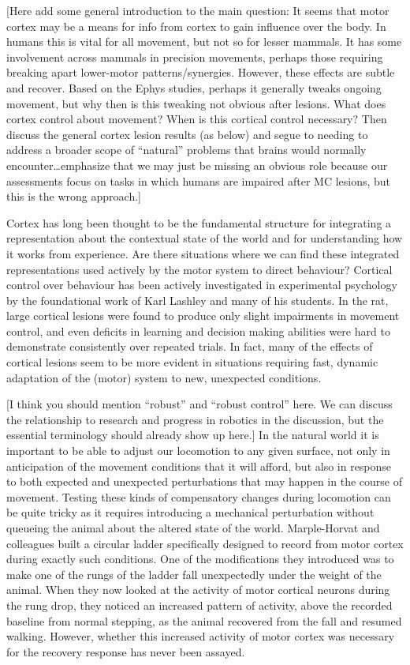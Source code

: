 [Here add some general introduction to the main question: It seems that motor cortex may be a means for info from cortex to gain influence over the body. In humans this is vital for all movement, but not so for lesser mammals. It has some involvement across mammals in precision movements, perhaps those requiring breaking apart lower-motor patterns/synergies. However, these effects are subtle and recover. Based on the Ephys studies, perhaps it generally tweaks ongoing movement, but why then is this tweaking not obvious after lesions. What does cortex control about movement? When is this cortical control necessary? Then discuss the general cortex lesion results (as below) and segue to needing to address a broader scope of “natural” problems that brains would normally encounter…emphasize that we may just be missing an obvious role because our assessments focus on tasks in which humans are impaired after MC lesions, but this is the wrong approach.]


Cortex has long been thought to be the fundamental structure for integrating a representation about the contextual state of the world and for understanding how it works from experience. Are there situations where we can find these integrated representations used actively by the motor system to direct behaviour? Cortical control over behaviour has been actively investigated in experimental psychology by the foundational work of Karl Lashley and many of his students. In the rat, large cortical lesions were found to produce only slight impairments in movement control, and even deficits in learning and decision making abilities were hard to demonstrate consistently over repeated trials. In fact, many of the effects of cortical lesions seem to be more evident in situations requiring fast, dynamic adaptation of the (motor) system to new, unexpected conditions.

[I think you should mention “robust” and “robust control” here. We can discuss the relationship to research and progress in robotics in the discussion, but the essential terminology should already show up here.]
In the natural world it is important to be able to adjust our locomotion to any given surface, not only in anticipation of the movement conditions that it will afford, but also in response to both expected and unexpected perturbations that may happen in the course of movement. Testing these kinds of compensatory changes during locomotion can be quite tricky as it requires introducing a mechanical perturbation without queueing the animal about the altered state of the world. Marple-Horvat and colleagues built a circular ladder specifically designed to record from motor cortex during exactly such conditions. One of the modifications they introduced was to make one of the rungs of the ladder fall unexpectedly under the weight of the animal. When they now looked at the activity of motor cortical neurons during the rung drop, they noticed an increased pattern of activity, above the recorded baseline from normal stepping, as the animal recovered from the fall and resumed walking. However, whether this increased activity of motor cortex was necessary for the recovery response has never been assayed.

